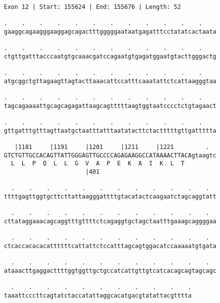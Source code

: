 \documentclass{article}
\begin{document}
\newpage
\begin{Verbatim}[fontfamily=courier]
Exon 12 | Start: 155624 | End: 155676 | Length: 52

.    .    .    .    .    .    .    .    .    .    .    .    
gaaggcagaagggaaggagcagactttgggggaataatgagatttcctatatcactaata

.    .    .    .    .    .    .    .    .    .    .    .    
ctgttgatttacccaatgtgcaaacgatccagaatgtgagatggaatgtacttgggactg

.    .    .    .    .    .    .    .    .    .    .    .    
atgcggctgttagaagttagtacttaaacattccatttcaaatattctcattaagggtaa

.    .    .    .    .    .    .    .    .    .    .    .    
tagcagaaaattgcagcagagattaagcagtttttaagtggtaatcccctctgtagaact

.    .    .    .    .    .    .    .    .    .    .    .    
gttgatttgtttagttaatgctaatttatttaatatacttctactttttgttgattttta

   |1181     |1191     |1201     |1211     |1221         .  
GTCTGTTGCCACAGTTATTGGGAGTTGCCCCAGAGAAGGCCATAAAACTTACAgtaagtc
  L  L  P  Q  L  L  G  V  A  P  E  K  A  I  K  L  T         
                       |401                                 

  .    .    .    .    .    .    .    .    .    .    .    .  
ttttgagttggtgcttcttattaagggattttgtacatactcaagaatctagcaggtatt

  .    .    .    .    .    .    .    .    .    .    .    .  
cttataggaaacagcaggtttgttttctcagaggtgctagctaatttgaaagcaggggaa

  .    .    .    .    .    .    .    .    .    .    .    .  
ctcaccacacacattttttcattattctccatttagcagtggacatccaaaaatgtgata

  .    .    .    .    .    .    .    .    .    .    .    .  
ataaacttgaggacttttggtggttgctgccatcattgttgtcatcacagcagtagcagc

  .    .    .    .    .    .    .    .    .    .    .
taaattcccttcagtatctaccatattaggcacatgacgtatattacgtttta
\end{Verbatim}
\newpage
\end{document}
